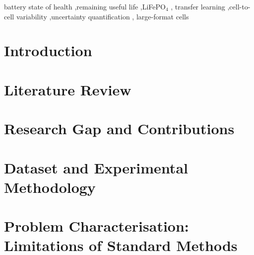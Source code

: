 \documentclass[a4paper,fleqn]{cas-dc}
\begin{document}

\begin{keywords}
battery state of health \sep remaining useful life \sep LiFePO$_4$ \sep
transfer learning \sep cell-to-cell variability \sep uncertainty quantification \sep
large-format cells
\end{keywords}

\maketitle

\section{Introduction}\label{sec:intro}


\section{Literature Review}\label{sec:literature}


\section{Research Gap and Contributions}\label{sec:gap}


\section{Dataset and Experimental Methodology}\label{sec:methodology}


\section{Problem Characterisation: Limitations of Standard Methods}\label{sec:problem}

\end{document}
